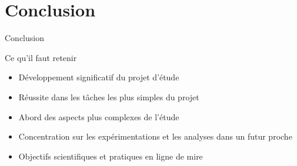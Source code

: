 \documentclass{beamer}
\begin{document}
    \section{Conclusion}
    \begin{frame}{Conclusion}
        \begin{block}{Ce qu'il faut retenir}
            \pause
            \begin{itemize}
                [<+->]
                \item Développement significatif du projet d'étude
                \item Réussite dans les tâches les plus simples du projet
                \item Abord des aspects plus complexes de l'étude
                \item Concentration sur les expérimentations et les analyses dans un futur proche
                \item Objectifs scientifiques et pratiques en ligne de mire
            \end{itemize}
        \end{block}
    \end{frame}
\end{document}
